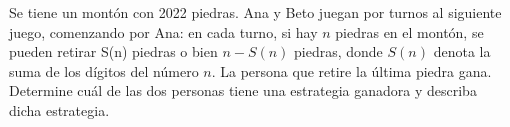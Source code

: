 Se tiene un montón con 2022 piedras. Ana y Beto juegan por turnos al siguiente juego, comenzando por Ana: en cada turno, si hay $n$ piedras en el montón, se pueden retirar S(n) piedras o bien $n-S(n)$ piedras, donde $S(n)$ denota la suma de los dígitos del número $n$. La persona que retire la última piedra gana. Determine cuál de las dos personas tiene una estrategia ganadora y describa dicha estrategia.